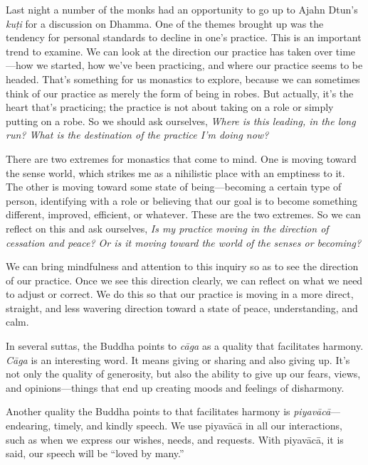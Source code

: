 
Last night a number of the monks had an opportunity to go up to Ajahn 
Dtun's \emph{kuṭi} for a discussion on Dhamma. One of the themes 
brought up was the tendency for personal standards to decline in one's 
practice. This is an important trend to examine. We can look at the 
direction our practice has taken over time---how we started, how we've 
been practicing, and where our practice seems to be headed. That's 
something for us monastics to explore, because we can sometimes think 
of our practice as merely the form of being in robes. But actually, 
it's the heart that's practicing; the practice is not about taking on a 
role or simply putting on a robe. So we should ask ourselves, 
\emph{Where is this leading, in the long run? What is the destination 
of the practice I'm doing now?}

There are two extremes for monastics that come to mind. One is moving 
toward the sense world, which strikes me as a nihilistic place with an 
emptiness to it. The other is moving toward some state of 
being---becoming a certain type of person, identifying with a role or 
believing that our goal is to become something different, improved, 
efficient, or whatever. These are the two extremes. So we can reflect 
on this and ask ourselves, \emph{Is my practice moving in the direction 
of cessation and peace? Or is it moving toward the world of the senses 
or becoming?}

We can bring mindfulness and attention to this inquiry so as to see the 
direction of our practice. Once we see this direction clearly, we can 
reflect on what we need to adjust or correct. We do this so that our 
practice is moving in a more direct, straight, and less wavering 
direction toward a state of peace, understanding, and calm.


In several suttas, the Buddha points to \emph{cāga} as a quality that 
facilitates harmony. \emph{Cāga} is an interesting word. It means 
giving or sharing and also giving up. It's not only the quality of 
generosity, but also the ability to give up our fears, views, and 
opinions---things that end up creating moods and feelings of disharmony.

Another quality the Buddha points to that facilitates harmony is 
\emph{piyavācā}---endearing, timely, and kindly speech. We use 
piyavācā in all our interactions, such as when we express our wishes, 
needs, and requests. With piyavācā, it is said, our speech will be 
``loved by many.''

